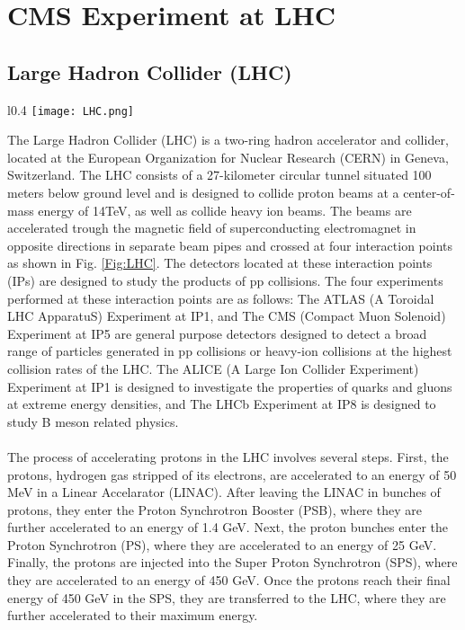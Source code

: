 \chapter{CMS Experiment at LHC}
\section*{Large Hadron Collider (LHC)}
\begin{wrapfigure}{l}{0.4\textwidth}
    \texttt{[image: LHC.png]}
    \caption{Schematic view of the LHC and the interaction points}
    \label{Fig:LHC}
\end{wrapfigure}
The Large Hadron Collider (LHC) is a  two-ring hadron accelerator and collider, located at the European Organization for Nuclear Research (CERN) in Geneva, Switzerland. The LHC consists of a 27-kilometer circular tunnel situated 100 meters below ground level and is designed to collide proton beams at a center-of-mass energy of 14TeV, as well as collide heavy ion beams. The beams are accelerated trough the magnetic field of superconducting electromagnet in opposite directions in separate beam pipes and crossed at four interaction points as shown in Fig. \ref{Fig:LHC}. The detectors located at these interaction points (IPs) are designed to study the products of pp collisions. The four experiments performed at these interaction points are as follows: The ATLAS (A Toroidal LHC ApparatuS) Experiment at IP1, and The CMS (Compact Muon Solenoid) Experiment at IP5 are general purpose detectors designed to detect a broad range of particles generated in pp collisions or heavy-ion collisions at the highest collision rates of the LHC. The ALICE (A Large Ion Collider Experiment) Experiment at IP1 is designed to investigate the properties of quarks and gluons at extreme energy densities, and The LHCb Experiment at IP8 is designed to study B meson related physics.\\
\\
The process of accelerating protons in the LHC involves several steps. First, the protons, hydrogen gas stripped of its electrons, are accelerated to an energy of 50 MeV in a Linear Accelarator (LINAC). After leaving the LINAC in bunches of protons, they enter the Proton Synchrotron Booster (PSB), where they are further accelerated to an energy of 1.4 GeV. Next, the proton bunches enter the Proton Synchrotron (PS), where they are accelerated to an energy of 25 GeV. Finally, the protons are injected into the Super Proton Synchrotron (SPS), where they are accelerated to an energy of 450 GeV. Once the protons reach their final energy of 450 GeV in the SPS, they are transferred to the LHC, where they are further accelerated to their maximum energy.

